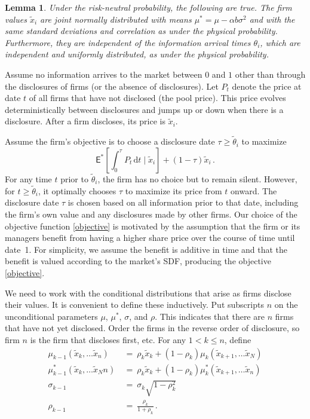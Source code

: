 \documentclass[ecta,nameyear,draft]{econsocart}
\theoremstyle{theorem}
\newtheorem{lemma}{Lemma}
\numberwithin{lemma}{section}
\numberwithin{proposition}{section}
\numberwithin{equation}{section}
\numberwithin{figure}{section}
\newcommand{\D}{\mathrm{d}}
\newcommand{\mye}{\ensuremath{\mathsf{E}}}
\begin{document}
\begin{lemma}\label{lemma:riskneutral}
Under the risk-neutral probability, the following are true.  The firm values $\tilde x_i$ are joint normally distributed with means $\mu^*  = \mu  - \alpha b\sigma^2$ and with the same standard deviations and correlation as under the physical probability.  Furthermore, they are independent of the information arrival times $\theta_i$, which are independent and uniformly distributed, as under the physical probability.
\end{lemma}  

Assume no information arrives to the market between $0$ and $1$ other than through the disclosures of firms (or the absence of disclosures).  Let $P_t$ denote the price at date $t$ of all firms that have not disclosed (the pool price).  This price evolves deterministically between disclosures and jumps up or down when there is a disclosure.  After a firm discloses, its price is $\tilde x_i$.  

Assume the firm's objective is to choose a disclosure date $\tau \ge \tilde \theta_i$ to maximize
\begin{equation}\label{objective}
 \mye^* \left[\int_0^\tau P_t \,\D t \mid \tilde x_i \right]  + (1-\tau)\tilde x_i \,.
\end{equation}
For any time $t$ prior to $\tilde \theta_i$, the firm has no choice but to remain silent. However, for $t \geq \tilde \theta_i$, it optimally chooses $\tau$ to maximize its price from $t$ onward. The disclosure date $\tau$ is chosen based on all information prior to that date, including the firm's own value and any disclosures made by other firms. Our choice of the objective function \eqref{objective} is motivated by the assumption that the firm or its managers benefit from having a higher share price over the course of time until date~1. For simplicity, we assume the benefit is additive in time and that the benefit is valued according to the market's SDF, producing the objective \eqref{objective}.

We need to work with the conditional distributions that arise as firms disclose their values.  It is convenient to define these inductively.  Put subscripts $n$ on the unconditional parameters $\mu$, $\mu^*$, $\sigma$, and $\rho$.  This indicates that there are $n$ firms that have not yet disclosed.  Order the firms in the reverse order of disclosure, so firm $n$ is the firm that discloses first, etc.  For any $1< k \le n$, define
\begin{subequations}\label{parameter_recursion}
\begin{align}
\mu_{k-1}(\tilde x_k, \ldots \tilde x_n) \ & = \ \rho_{k} \tilde x_{k} + (1-\rho_{k})\mu_{k}(\tilde x_{k+1},\ldots \tilde x_{N})\\
\mu^*_{k-1}(\tilde x_k, \ldots \tilde x_Nn) \ & = \ \rho_{k} \tilde x_k + (1-\rho_{k})\mu^*_{k}(\tilde x_{k+1}, \ldots \tilde x_{n})\\
\sigma_{k-1} \ & = \ \sigma_{k}\sqrt{1-\rho_{k}^2}\\
\rho_{k-1} \ & = \ \frac{\rho_{k}}{1+\rho_{k}}\,. \label{rhon}
\end{align}
\end{subequations}
\end{document}

